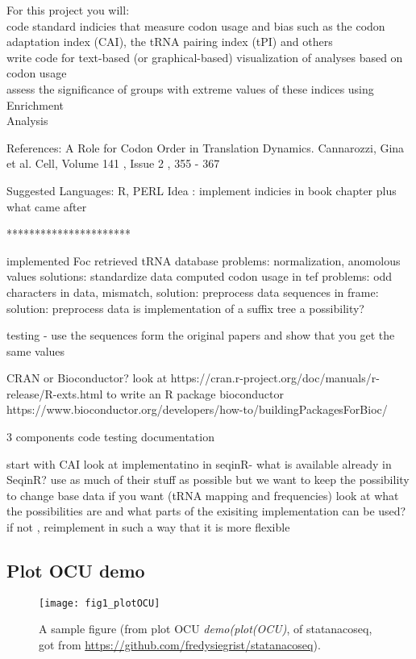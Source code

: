 For this project you will:\\
code standard indicies that measure codon usage and bias such as the codon adaptation index 
(CAI), the tRNA pairing index (tPI) and others \\
write code for text-based (or graphical-based) visualization of analyses based on codon usage\\
assess the significance of groups with extreme values of these indices using Enrichment\\

Analysis 

References: A Role for Codon Order in Translation Dynamics. Cannarozzi, Gina et al. Cell, 
Volume 141 , Issue 2 , 355 - 367

Suggested Languages: R, PERL
Idea : implement indicies in book chapter plus what came after 

**********************

implemented Foc
retrieved tRNA database problems: normalization, anomolous values solutions: standardize data
computed codon usage in tef problems: odd characters in data, mismatch, solution: preprocess data
sequences in frame: solution: preprocess data
is implementation of a suffix tree a possibility?



testing - use the sequences form the original papers and show that you get the same values

CRAN or Bioconductor?
look at https://cran.r-project.org/doc/manuals/r-release/R-exts.html to write an R package
bioconductor  https://www.bioconductor.org/developers/how-to/buildingPackagesForBioc/

3 components
  code
  testing
  documentation

start with CAI
 look at implementatino in seqinR-  what is available already in SeqinR? use as much of their stuff as possible but we want to keep the possibility to change base data if you want (tRNA mapping and frequencies)
 look at what the possibilities are and what parts of the exisiting implementation can be used?
 if not , reimplement in such a way that it is more flexible 


\subsection{Plot OCU demo}
\begin{figure}[tb] 
\centering 
\texttt{[image: fig1\_plotOCU]} 
\caption[A sample figure from demo plotOCU]{A sample figure (from plot OCU \emph{demo(plot(OCU)}, of statanacoseq, got from \url{https://github.com/fredysiegrist/statanacoseq}).}
\label{fig:plotOCU} 
\end{figure}
